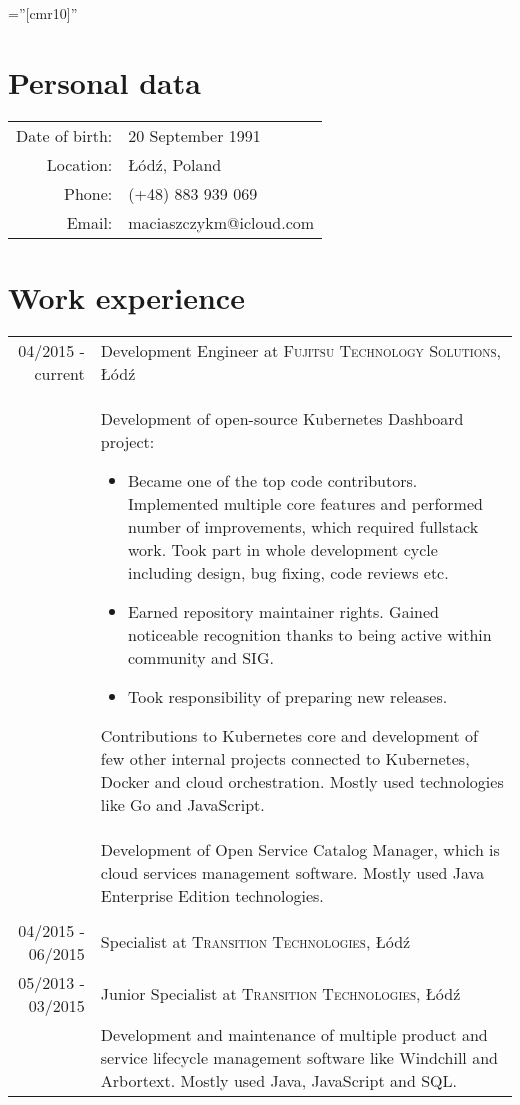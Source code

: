 \documentclass[a4paper,10pt]{article}
\begin{document}
\font\fb=''[cmr10]'' 
\par{}

\section{Personal data}

\begin{tabular}{rl}
    Date of birth: & 20 September 1991 \\
    Location: & Łódź, Poland \\
    Phone: & (+48) 883 939 069\\
    Email: & maciaszczykm@icloud.com
\end{tabular}

\section{Work experience}

\begin{tabular}{r|p{11cm}}

04/2015 - current & Development Engineer at \textsc{Fujitsu Technology Solutions}, Łódź \\
 & \footnotesize{Development of open-source Kubernetes Dashboard project:
 \begin{itemize}
 	\item Became one of the top code contributors. Implemented multiple core features and performed number of improvements, which required fullstack work. Took part in whole development cycle including design, bug fixing, code reviews etc.
 	\item Earned repository maintainer rights. Gained noticeable recognition thanks to being active within community and SIG.
 	\item Took responsibility of preparing new releases.
 \end{itemize}
 Contributions to Kubernetes core and development of few other internal projects connected to Kubernetes, Docker and cloud orchestration. Mostly used technologies like Go and JavaScript.}\\
 & \footnotesize{Development of Open Service Catalog Manager, which is cloud services management software. Mostly used Java Enterprise Edition technologies.}\\\multicolumn{2}{c}{} \\

 
04/2015 - 06/2015 & Specialist at \textsc{Transition Technologies}, Łódź \\
05/2013 - 03/2015 & Junior Specialist at \textsc{Transition Technologies}, Łódź \\
 & \footnotesize{Development and maintenance of multiple product and service lifecycle management software like Windchill and Arbortext. Mostly used Java, JavaScript and SQL.}\\
 
\end{tabular}
\end{document}
